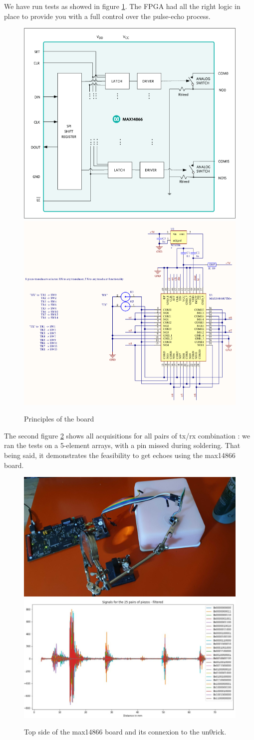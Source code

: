 \documentclass{article}
\begin{document}
We have run tests as showed in figure \ref{fig:schme}. The FPGA had all the right logic in place to provide you with a full control over the pulse-echo process.


\begin{figure}[htp!]
  \centering
  \includegraphics[width=.5\textwidth]{images/9408.png}\hfill
  \includegraphics[width=.5\textwidth]{images/schem.png} 
  \caption{Principles of the board} 
  \label{fig:schme}
\end{figure}

The second figure \ref{fig:acq} shows all acquisitions for all pairs of tx/rx combination : we ran the tests on a 5-element arrays, with a pin missed during soldering. That being said, it demonstrates the feasibility to get echoes using the max14866 board.

\begin{figure}[htp!]
  \centering
  \includegraphics[width=.5\textwidth]{../src/experiment/20210425_203655.jpg}\hfill
  \includegraphics[width=.5\textwidth]{../src/experiment/filtered_sigs.jpg} 
  \caption{Top side of the max14866 board and its connexion to the un0rick.} 
  \label{fig:acq}
\end{figure}
\end{document}
